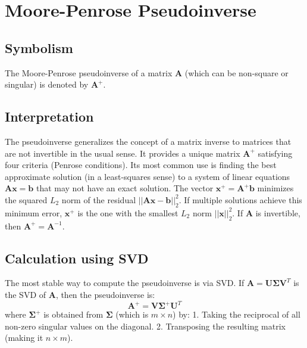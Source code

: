 \documentclass{article}
\newcommand{\vect}[1]{\bm{#1}} %
\newcommand{\mat}[1]{\bm{#1}}  %
\begin{document}
\section{Moore-Penrose Pseudoinverse}

\subsection*{Symbolism}
The Moore-Penrose pseudoinverse of a matrix $\mat{A}$ (which can be non-square or singular) is denoted by $\mat{A}^{+}$.

\subsection*{Interpretation}
The pseudoinverse generalizes the concept of a matrix inverse to matrices that are not invertible in the usual sense. It provides a unique matrix $\mat{A}^{+}$ satisfying four criteria (Penrose conditions). Its most common use is finding the best approximate solution (in a least-squares sense) to a system of linear equations $\mat{A}\vect{x} = \vect{b}$ that may not have an exact solution. The vector $\vect{x}^{+} = \mat{A}^{+}\vect{b}$ minimizes the squared $L_2$ norm of the residual $||\mat{A}\vect{x} - \vect{b}||_2^2$. If multiple solutions achieve this minimum error, $\vect{x}^{+}$ is the one with the smallest $L_2$ norm $||\vect{x}||_2^2$. If $\mat{A}$ is invertible, then $\mat{A}^{+} = \mat{A}^{-1}$.

\subsection*{Calculation using SVD}
The most stable way to compute the pseudoinverse is via SVD. If $\mat{A} = \mat{U} \mat{\Sigma} \mat{V}^T$ is the SVD of $\mat{A}$, then the pseudoinverse is:
\[ \mat{A}^{+} = \mat{V} \mat{\Sigma}^{+} \mat{U}^T \]
where $\mat{\Sigma}^{+}$ is obtained from $\mat{\Sigma}$ (which is $m \times n$) by:
1. Taking the reciprocal of all non-zero singular values on the diagonal.
2. Transposing the resulting matrix (making it $n \times m$).
\end{document}
